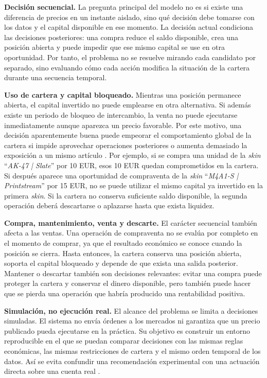 \textbf{Decisión secuencial.} La pregunta principal del modelo no es si existe una diferencia de precios en un instante aislado, sino qué decisión debe tomarse con los datos y el capital disponible en ese momento. La decisión actual condiciona las decisiones posteriores: una compra reduce el saldo disponible, crea una posición abierta y puede impedir que ese mismo capital se use en otra oportunidad. Por tanto, el problema no se resuelve mirando cada candidato por separado, sino evaluando cómo cada acción modifica la situación de la cartera durante una secuencia temporal.

\textbf{Uso de cartera y capital bloqueado.} Mientras una posición permanece abierta, el capital invertido no puede emplearse en otra alternativa. Si además existe un periodo de bloqueo de intercambio, la venta no puede ejecutarse inmediatamente aunque aparezca un precio favorable. Por este motivo, una decisión aparentemente buena puede empeorar el comportamiento global de la cartera si impide aprovechar operaciones posteriores o aumenta demasiado la exposición a un mismo artículo \cite{markowitz1952portfolio,liu2021finrl}. Por ejemplo, si se compra una unidad de la \textit{skin} \enquote{\textit{AK-47 | Slate}} por 10 EUR, esos 10 EUR quedan comprometidos en la cartera. Si después aparece una oportunidad de compraventa de la \textit{skin} \enquote{\textit{M4A1-S | Printstream}} por 15 EUR, no se puede utilizar el mismo capital ya invertido en la primera \textit{skin}. Si la cartera no conserva suficiente saldo disponible, la segunda operación deberá descartarse o aplazarse hasta que exista liquidez.

\textbf{Compra, mantenimiento, venta y descarte.} El carácter secuencial también afecta a las ventas. Una operación de compraventa no se evalúa por completo en el momento de comprar, ya que el resultado económico se conoce cuando la posición se cierra. Hasta entonces, la cartera conserva una posición abierta, soporta el capital bloqueado y depende de que exista una salida posterior. Mantener o descartar también son decisiones relevantes: evitar una compra puede proteger la cartera y conservar el dinero disponible, pero también puede hacer que se pierda una operación que habría producido una rentabilidad positiva.

\textbf{Simulación, no ejecución real.} El alcance del problema se limita a decisiones simuladas. El sistema no envía órdenes a los mercados ni garantiza que un precio publicado pueda ejecutarse en la práctica. Su objetivo es construir un entorno reproducible en el que se puedan comparar decisiones con las mismas reglas económicas, las mismas restricciones de cartera y el mismo orden temporal de los datos. Así se evita confundir una recomendación experimental con una actuación directa sobre una cuenta real \cite{pineau2021reproducibility}.

